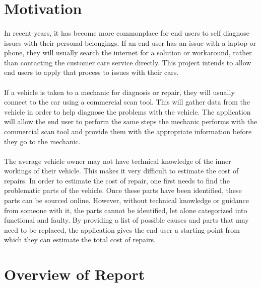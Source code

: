 \section{Motivation}
	\paragraph{}{
	In recent years, it has become more commonplace for end users to self diagnose issues with their personal belongings. If an end user has an issue with a laptop or phone, they will usually search the internet for a solution or workaround, rather than contacting the customer care service directly. This project intends to allow end users to apply that process to issues with their cars.
	}
	\paragraph{}{
	If a vehicle is taken to a mechanic for diagnosis or repair, they will usually connect to the car using a commercial scan tool. This will gather data from the vehicle in order to help diagnose the problems with the vehicle. The application will allow the end user to perform the same steps the mechanic performs with the commercial scan tool and provide them with the appropriate information before they go to the mechanic.
	}
	\paragraph{}{
	The average vehicle owner may not have technical knowledge of the inner workings of their vehicle. This makes it very difficult to estimate the cost of repairs. In order to estimate the cost of repair, one first needs to find the problematic parts of the vehicle. Once these parts have been identified, these parts can be sourced online. However, without technical knowledge or guidance from someone with it, the parts cannot be identified, let alone categorized into functional and faulty. By providing a list of possible causes and parts that may need to be replaced, the application gives the end user a starting point from which they can estimate the total cost of repairs. 
	}

\section{Overview of Report}
